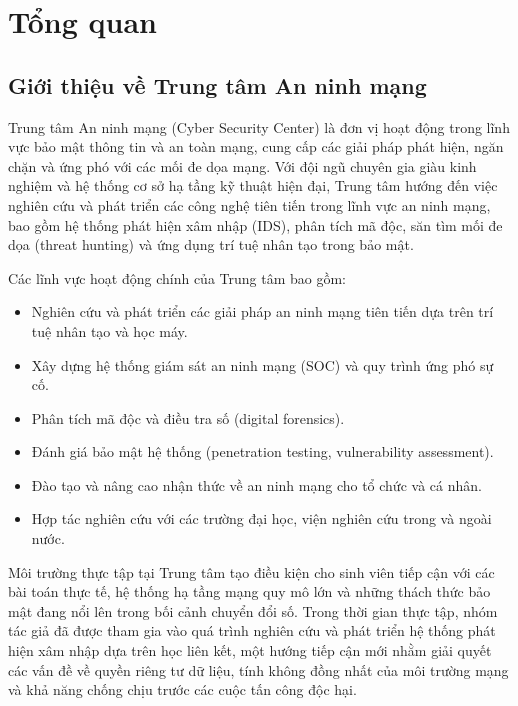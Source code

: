 \pagebreak

\chapter{Tổng quan}

\section{Giới thiệu về Trung tâm An ninh mạng}
\label{sec:company}

Trung tâm An ninh mạng (Cyber Security Center) là đơn vị hoạt động trong lĩnh vực bảo mật thông tin và an toàn mạng, cung cấp các giải pháp phát hiện, ngăn chặn và ứng phó với các mối đe dọa mạng. Với đội ngũ chuyên gia giàu kinh nghiệm và hệ thống cơ sở hạ tầng kỹ thuật hiện đại, Trung tâm hướng đến việc nghiên cứu và phát triển các công nghệ tiên tiến trong lĩnh vực an ninh mạng, bao gồm hệ thống phát hiện xâm nhập (IDS), phân tích mã độc, săn tìm mối đe dọa (threat hunting) và ứng dụng trí tuệ nhân tạo trong bảo mật.

Các lĩnh vực hoạt động chính của Trung tâm bao gồm:
\begin{itemize}
    \item Nghiên cứu và phát triển các giải pháp an ninh mạng tiên tiến dựa trên trí tuệ nhân tạo và học máy.
    \item Xây dựng hệ thống giám sát an ninh mạng (SOC) và quy trình ứng phó sự cố.
    \item Phân tích mã độc và điều tra số (digital forensics).
    \item Đánh giá bảo mật hệ thống (penetration testing, vulnerability assessment).
    \item Đào tạo và nâng cao nhận thức về an ninh mạng cho tổ chức và cá nhân.
    \item Hợp tác nghiên cứu với các trường đại học, viện nghiên cứu trong và ngoài nước.
\end{itemize}

Môi trường thực tập tại Trung tâm tạo điều kiện cho sinh viên tiếp cận với các bài toán thực tế, hệ thống hạ tầng mạng quy mô lớn và những thách thức bảo mật đang nổi lên trong bối cảnh chuyển đổi số. Trong thời gian thực tập, nhóm tác giả đã được tham gia vào quá trình nghiên cứu và phát triển hệ thống phát hiện xâm nhập dựa trên học liên kết, một hướng tiếp cận mới nhằm giải quyết các vấn đề về quyền riêng tư dữ liệu, tính không đồng nhất của môi trường mạng và khả năng chống chịu trước các cuộc tấn công độc hại.

